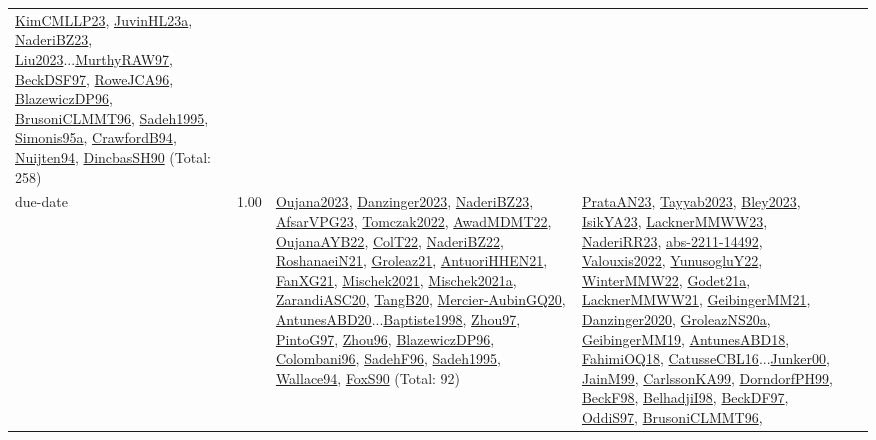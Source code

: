 {\begin{longtable}{p{3cm}r>{\raggedright\arraybackslash}p{6cm}>{\raggedright\arraybackslash}p{6cm}>{\raggedright\arraybackslash}p{8cm}}
\hyperref[detail:KimCMLLP23]{KimCMLLP23}, \hyperref[detail:JuvinHL23a]{JuvinHL23a}, \hyperref[detail:NaderiBZ23]{NaderiBZ23}, \hyperref[detail:Liu2023]{Liu2023}...\hyperref[detail:MurthyRAW97]{MurthyRAW97}, \hyperref[detail:BeckDSF97]{BeckDSF97}, \hyperref[detail:RoweJCA96]{RoweJCA96}, \hyperref[detail:BlazewiczDP96]{BlazewiczDP96}, \hyperref[detail:BrusoniCLMMT96]{BrusoniCLMMT96}, \hyperref[detail:Sadeh1995]{Sadeh1995}, \hyperref[detail:Simonis95a]{Simonis95a}, \hyperref[detail:CrawfordB94]{CrawfordB94}, \hyperref[detail:Nuijten94]{Nuijten94}, \hyperref[detail:DincbasSH90]{DincbasSH90} (Total: 258)\\
\index{due-date}\index{Concepts!due-date}due-date &  1.00 & \hyperref[detail:Oujana2023]{Oujana2023}, \hyperref[detail:Danzinger2023]{Danzinger2023}, \hyperref[detail:NaderiBZ23]{NaderiBZ23}, \hyperref[detail:AfsarVPG23]{AfsarVPG23}, \hyperref[detail:Tomczak2022]{Tomczak2022}, \hyperref[detail:AwadMDMT22]{AwadMDMT22}, \hyperref[detail:OujanaAYB22]{OujanaAYB22}, \hyperref[detail:ColT22]{ColT22}, \hyperref[detail:NaderiBZ22]{NaderiBZ22}, \hyperref[detail:RoshanaeiN21]{RoshanaeiN21}, \hyperref[detail:Groleaz21]{Groleaz21}, \hyperref[detail:AntuoriHHEN21]{AntuoriHHEN21}, \hyperref[detail:FanXG21]{FanXG21}, \hyperref[detail:Mischek2021]{Mischek2021}, \hyperref[detail:Mischek2021a]{Mischek2021a}, \hyperref[detail:ZarandiASC20]{ZarandiASC20}, \hyperref[detail:TangB20]{TangB20}, \hyperref[detail:Mercier-AubinGQ20]{Mercier-AubinGQ20}, \hyperref[detail:AntunesABD20]{AntunesABD20}...\hyperref[detail:Baptiste1998]{Baptiste1998}, \hyperref[detail:Zhou97]{Zhou97}, \hyperref[detail:PintoG97]{PintoG97}, \hyperref[detail:Zhou96]{Zhou96}, \hyperref[detail:BlazewiczDP96]{BlazewiczDP96}, \hyperref[detail:Colombani96]{Colombani96}, \hyperref[detail:SadehF96]{SadehF96}, \hyperref[detail:Sadeh1995]{Sadeh1995}, \hyperref[detail:Wallace94]{Wallace94}, \hyperref[detail:FoxS90]{FoxS90} (Total: 92) & \hyperref[detail:PrataAN23]{PrataAN23}, \hyperref[detail:Tayyab2023]{Tayyab2023}, \hyperref[detail:Bley2023]{Bley2023}, \hyperref[detail:IsikYA23]{IsikYA23}, \hyperref[detail:LacknerMMWW23]{LacknerMMWW23}, \hyperref[detail:NaderiRR23]{NaderiRR23}, \hyperref[detail:abs-2211-14492]{abs-2211-14492}, \hyperref[detail:Valouxis2022]{Valouxis2022}, \hyperref[detail:YunusogluY22]{YunusogluY22}, \hyperref[detail:WinterMMW22]{WinterMMW22}, \hyperref[detail:Godet21a]{Godet21a}, \hyperref[detail:LacknerMMWW21]{LacknerMMWW21}, \hyperref[detail:GeibingerMM21]{GeibingerMM21}, \hyperref[detail:Danzinger2020]{Danzinger2020}, \hyperref[detail:GroleazNS20a]{GroleazNS20a}, \hyperref[detail:GeibingerMM19]{GeibingerMM19}, \hyperref[detail:AntunesABD18]{AntunesABD18}, \hyperref[detail:FahimiOQ18]{FahimiOQ18}, \hyperref[detail:CatusseCBL16]{CatusseCBL16}...\hyperref[detail:Junker00]{Junker00}, \hyperref[detail:JainM99]{JainM99}, \hyperref[detail:CarlssonKA99]{CarlssonKA99}, \hyperref[detail:DorndorfPH99]{DorndorfPH99}, \hyperref[detail:BeckF98]{BeckF98}, \hyperref[detail:BelhadjiI98]{BelhadjiI98}, \hyperref[detail:BeckDF97]{BeckDF97}, \hyperref[detail:OddiS97]{OddiS97}, \hyperref[detail:BrusoniCLMMT96]{BrusoniCLMMT96}, 
\end{longtable}}
